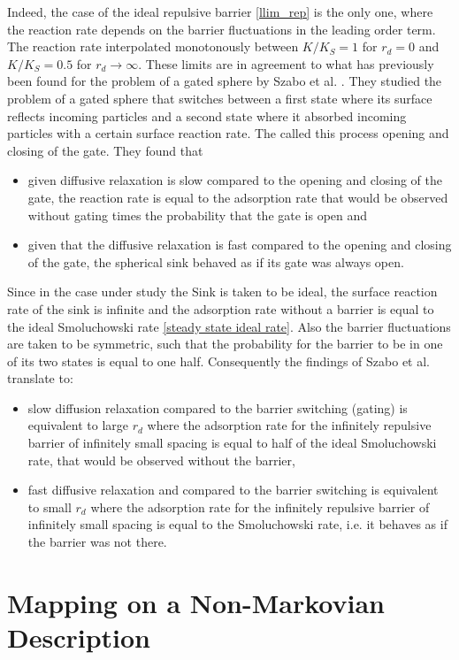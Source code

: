 Indeed, the case of the ideal repulsive barrier \eqref{llim_rep} is the only one, where the reaction rate depends on the barrier fluctuations in the leading order term. The reaction rate interpolated monotonously between $K/K_S = 1$ for $r_d = 0$ and $K/K_S = 0.5$ for $r_d \rightarrow \infty$. These limits are in agreement to what has previously been found for the problem of a gated sphere by Szabo et al. \cite{Szabo1982}. 
They studied the problem of a gated sphere that switches between a first state where its surface reflects incoming particles and a second state where it absorbed incoming particles with a certain surface reaction rate. The called this process opening and closing of the gate.
They found that 
\begin{itemize}
    \item given diffusive relaxation is slow compared to the opening and closing of the gate, the reaction rate is equal to the adsorption rate that would be observed without gating times the probability that the gate is open and
    \item given that the diffusive relaxation is fast compared to the opening and closing of the gate, the spherical sink behaved as if its gate was always open.
\end{itemize}
Since in the case under study the Sink is taken to be ideal, the surface reaction rate of the sink is infinite and the adsorption rate without a barrier is equal to the ideal Smoluchowski rate \eqref{steady state ideal rate}. Also the barrier fluctuations are taken to be symmetric, such that the probability for the barrier to be in one of its two states is equal to one half.
Consequently the findings of Szabo et al. translate to:
\begin{itemize}
    \item slow diffusion relaxation compared to the barrier switching (gating) is equivalent to large $r_d$ where the adsorption rate for the infinitely repulsive barrier of infinitely small spacing is equal to half of the ideal Smoluchowski rate, that would be observed without the barrier,
    \item fast diffusive relaxation and compared to the barrier switching is equivalent to small $r_d$ where the adsorption rate for the infinitely repulsive barrier of infinitely small spacing is equal to the Smoluchowski rate, i.e. it behaves as if the barrier was not there.
\end{itemize}


\newpage
\section{Mapping on a Non-Markovian Description}
